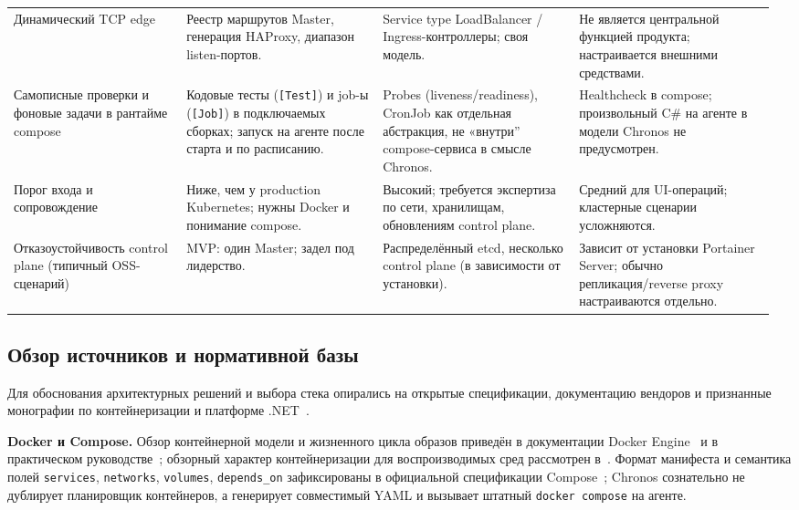 {\begin{longtable}{@{}p{0.22\linewidth}p{0.25\linewidth}p{0.25\linewidth}p{0.25\linewidth}@{}}
Динамический TCP edge &
Реестр маршрутов Master, генерация HAProxy, диапазон listen-портов. &
Service type LoadBalancer / Ingress-контроллеры; своя модель. &
Не является центральной функцией продукта; настраивается внешними средствами. \\
\addlinespace

Самописные проверки и фоновые задачи в рантайме compose &
Кодовые тесты (\texttt{[Test]}) и job-ы (\texttt{[Job]}) в подключаемых сборках; запуск на агенте после старта и по расписанию. &
Probes (liveness/readiness), CronJob как отдельная абстракция, не «внутри'' compose-сервиса в смысле Chronos. &
Healthcheck в compose; произвольный C\# на агенте в модели Chronos не предусмотрен. \\
\addlinespace

Порог входа и сопровождение &
Ниже, чем у production Kubernetes; нужны Docker и понимание compose. &
Высокий; требуется экспертиза по сети, хранилищам, обновлениям control plane. &
Средний для UI-операций; кластерные сценарии усложняются. \\
\addlinespace

Отказоустойчивость control plane (типичный OSS-сценарий) &
MVP: один Master; задел под лидерство. &
Распределённый etcd, несколько control plane (в зависимости от установки). &
Зависит от установки Portainer Server; обычно репликация/reverse proxy настраиваются отдельно. \\
\bottomrule

\end{longtable}
}

\subsection{Обзор источников и нормативной базы}

Для обоснования архитектурных решений и выбора стека опирались на открытые спецификации, документацию вендоров и признанные монографии по контейнеризации и платформе .NET~\cite{docker_get_started,docker_engine_docs,matthias2018docker,boettiger2015docker,dotnet_docs,aspnetcore_docs,smith2022modern_web,griffiths2021csharp,freeman2023proaspnet}.

\textbf{Docker и Compose.} Обзор контейнерной модели и жизненного цикла образов приведён в документации Docker Engine~\cite{docker_engine_docs,docker_get_started} и в практическом руководстве~\cite{matthias2018docker}; обзорный характер контейнеризации для воспроизводимых сред рассмотрен в~\cite{boettiger2015docker}. Формат манифеста и семантика полей \texttt{services}, \texttt{networks}, \texttt{volumes}, \texttt{depends\_on} зафиксированы в официальной спецификации Compose~\cite{docker_compose_spec}; Chronos сознательно не дублирует планировщик контейнеров, а генерирует совместимый YAML и вызывает штатный \texttt{docker compose} на агенте.

